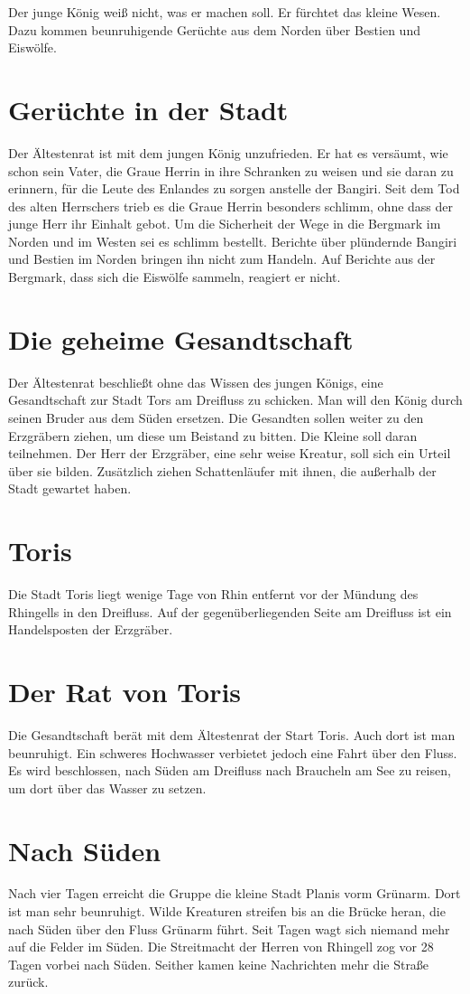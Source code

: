 Der junge König weiß nicht, was er machen soll. Er fürchtet das kleine Wesen. Dazu kommen beunruhigende Gerüchte aus dem Norden über Bestien und Eiswölfe. 

\section{Gerüchte in der Stadt}
Der Ältestenrat ist mit dem jungen König unzufrieden. Er hat es versäumt, wie schon sein Vater, die Graue Herrin in ihre Schranken zu weisen und sie daran zu erinnern, für die Leute des Enlandes zu sorgen anstelle der Bangiri. Seit dem Tod des alten Herrschers trieb es die Graue Herrin besonders schlimm, ohne dass der junge Herr ihr Einhalt gebot. Um die Sicherheit der Wege in die Bergmark im Norden und im Westen sei es schlimm bestellt. Berichte über plündernde Bangiri und Bestien im Norden bringen ihn nicht zum Handeln. Auf Berichte aus der Bergmark, dass sich die Eiswölfe sammeln, reagiert er nicht.

\section{Die geheime Gesandtschaft}
Der Ältestenrat beschließt ohne das Wissen des jungen Königs, eine Gesandtschaft zur Stadt Tors am Dreifluss zu schicken. Man will den König durch seinen Bruder aus dem Süden ersetzen. Die Gesandten sollen weiter zu den Erzgräbern ziehen, um diese um Beistand zu bitten. Die Kleine soll daran teilnehmen. Der Herr der Erzgräber, eine sehr weise Kreatur, soll sich ein Urteil über sie bilden. Zusätzlich ziehen Schattenläufer mit ihnen, die außerhalb der Stadt gewartet haben.

\section{Toris}
Die Stadt Toris liegt wenige Tage von Rhin entfernt vor der Mündung des Rhingells in den Dreifluss. Auf der gegenüberliegenden Seite am Dreifluss ist ein Handelsposten der Erzgräber.

\section{Der Rat von Toris}
Die Gesandtschaft berät mit dem Ältestenrat der Start Toris. Auch dort ist man beunruhigt. Ein schweres Hochwasser verbietet jedoch eine Fahrt über den Fluss. Es wird beschlossen, nach Süden am Dreifluss nach Braucheln am See zu reisen, um dort über das Wasser zu setzen.

\section{Nach Süden}
Nach vier Tagen erreicht die Gruppe die kleine Stadt Planis vorm Grünarm. Dort ist man sehr beunruhigt. Wilde Kreaturen streifen bis an die Brücke heran, die nach Süden über den Fluss Grünarm führt. Seit Tagen wagt sich niemand mehr auf die Felder im Süden. Die Streitmacht der Herren von Rhingell zog vor 28 Tagen vorbei nach Süden. Seither kamen keine Nachrichten mehr die Straße zurück.
